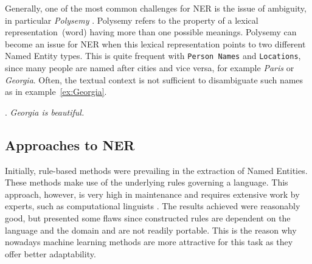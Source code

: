\documentclass[11pt]{article}
\begin{document}
Generally, one of the most common challenges for NER is the issue of ambiguity, in particular \emph{Polysemy} \cite{nadeau2007survey}. %
Polysemy refers to the property of a lexical representation~(word) having more than one possible meanings. Polysemy can become an issue for NER when this lexical representation 
points to two different Named Entity types.
This is quite frequent with \texttt{Person Names} and \texttt{Locations}, since many people are named after cities and vice versa, for example \emph{Paris} or \emph{Georgia}. 
Often, the textual context is not sufficient to disambiguate such names as in example~\ref{ex:Georgia}.

\ex. \emph{Georgia is beautiful.} \label{ex:Georgia}




\subsection{Approaches to NER}

Initially, rule-based methods were prevailing in the extraction of Named Entities. These methods make use of the underlying rules governing a language.
This approach, however, is very high in maintenance and requires extensive work by experts, such as computational linguists \cite{nadeau2007survey}.
The results achieved were reasonably good, but presented some flaws since constructed rules are dependent on the language and the domain and are not readily portable. 
This is the reason why nowadays machine learning methods are more attractive for this task as they offer better adaptability.
\end{document}
